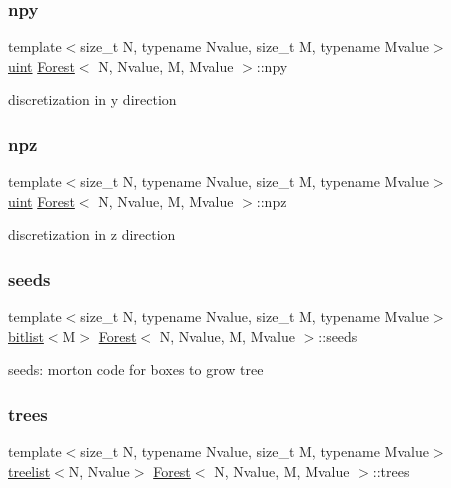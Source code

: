 \subsubsection{\texorpdfstring{npy}{npy}}
{\footnotesize\ttfamily template$<$size\+\_\+t N, typename Nvalue, size\+\_\+t M, typename Mvalue$>$ \\
\mbox{\hyperlink{definitions_8h_a69aa29b598b851b0640aa225a9e5d61d}{uint}} \mbox{\hyperlink{classForest}{Forest}}$<$ N, Nvalue, M, Mvalue $>$\+::npy\hspace{0.3cm}{\ttfamily [protected]}}

discretization in y direction \mbox{\label{classForest_a7778c276ec9566b1efa4b1aa8a136bf5}} 
\subsubsection{\texorpdfstring{npz}{npz}}
{\footnotesize\ttfamily template$<$size\+\_\+t N, typename Nvalue, size\+\_\+t M, typename Mvalue$>$ \\
\mbox{\hyperlink{definitions_8h_a69aa29b598b851b0640aa225a9e5d61d}{uint}} \mbox{\hyperlink{classForest}{Forest}}$<$ N, Nvalue, M, Mvalue $>$\+::npz\hspace{0.3cm}{\ttfamily [protected]}}

discretization in z direction \mbox{\label{classForest_a1585582bca7201113f97a6ff2f5dc859}} 
\subsubsection{\texorpdfstring{seeds}{seeds}}
{\footnotesize\ttfamily template$<$size\+\_\+t N, typename Nvalue, size\+\_\+t M, typename Mvalue$>$ \\
\mbox{\hyperlink{definitions_8h_ad1cc49840e065ce2a93cd243916d310c}{bitlist}}$<$M$>$ \mbox{\hyperlink{classForest}{Forest}}$<$ N, Nvalue, M, Mvalue $>$\+::seeds\hspace{0.3cm}{\ttfamily [private]}}

seeds\+: morton code for boxes to grow tree \mbox{\label{classForest_ae9d42713a72e131d95579babb5a5239c}} 
\subsubsection{\texorpdfstring{trees}{trees}}
{\footnotesize\ttfamily template$<$size\+\_\+t N, typename Nvalue, size\+\_\+t M, typename Mvalue$>$ \\
\mbox{\hyperlink{forest_8h_af5ed6d1f9068fb44be5133afda14c2ac}{treelist}}$<$N, Nvalue$>$ \mbox{\hyperlink{classForest}{Forest}}$<$ N, Nvalue, M, Mvalue $>$\+::trees\hspace{0.3cm}{\ttfamily [private]}}

